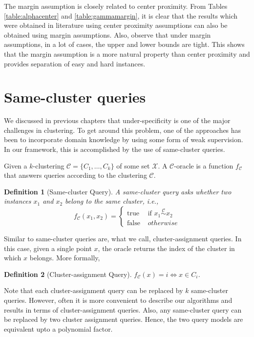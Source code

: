 \documentclass[letterpaper,12pt,titlepage,oneside,final]{book}
\newtheorem{definition}{Definition}
\newcommand{\mc}{\mathcal}
\begin{document}
\noindent The margin assumption is closely related to center proximity. From Tables \ref{table:alphacenter} and \ref{table:gammamargin}, it is clear that the results which were obtained in literature using center proximity assumptions can also be obtained using margin assumptions. Also, observe that under margin assumptions, in a lot of cases, the upper and lower bounds are tight. This shows that the margin assumption is a more natural property than center proximity and provides separation of easy and hard instances. 

\section{Same-cluster queries}
We discussed in previous chapters that under-specificity is one of the major challenges in clustering. To get around this problem, one of the approaches has been to incorporate domain knowledge by using some form of weak supervision. In our framework, this is accomplished by the use of same-cluster queries. 

Given a $k$-clustering $\mc C = \{C_1, \ldots, C_k\}$ of some set $\mc X$. A $\mc C$-oracle is a function $f_{\mc C}$ that answers queries according to the clustering $\mc C$.

\begin{definition}[Same-cluster Query]
\label{defn:sameclusterquery}
A same-cluster query asks whether two instances $x_1$ and $x_2$ belong to the same cluster, i.e., 
$$f_{\mc C}(x_1, x_2) = \left\{
	\begin{array}{ll}
		\mbox{true }  & \mbox{if } x_1 \overset{\mc C}{\sim} x_2   \\
		\mbox{false } & otherwise 
	\end{array}
\right. $$
\end{definition} 

Similar to same-cluster queries are, what we call, cluster-assignment queries. In this case, given a single point $x$, the oracle returns the index of the cluster in which $x$ belongs. More formally, 

\begin{definition}[Cluster-assignment Query]
$f_{\mc C}(x) = i \iff x \in C_i$.
\end{definition}

Note that each cluster-assignment query can be replaced by $k$ same-cluster queries. However, often it is more convenient to describe our algorithms and results in terms of cluster-assignment queries. Also, any same-cluster query can be replaced by two cluster assignment queries. Hence, the two query models are equivalent upto a polynomial factor. 
\end{document}
